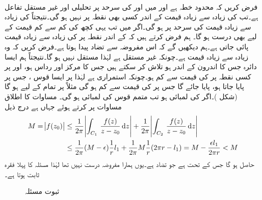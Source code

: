 \quad {}\\
فرض کریں کہ  محدود خطہ ہے اور  میں اور  کی سرحد  پر  تحلیلی اور غیر مستقل  تفاعل ہے۔تب   کی زیادہ سے زیادہ قیمت  کے اندر کسی بھی نقطہ پر نہیں ہو گی۔نتیجتاً  کی زیادہ سے زیادہ قیمت  کی سرحد پر ہو گی۔اگر  میں  تب یہی کچھ  کی کم سے کم قیمت کے لیے بھی درست ہو گا۔
\quad
ہم فرض کرتے ہیں کہ  کے اندر نقطہ  پر  کی زیادہ سے زیادہ قیمت پائی جاتی ہے۔ہم دیکھیں گے کہ اس مفروضہ سے تضاد پیدا ہوتا ہے۔فرض کریں کہ وہ زیادہ سے زیادہ قیمت  ہے۔چونکہ  غیر مستقل ہے لہٰذا  مستقل نہیں ہو گا۔نتیجتاً ہم  ایسا دائرہ  جس کا اندرون  کے اندر  ہو تلاش کر سکتے ہیں جس کا مرکز  اور رداس  ہو، اور  پر کسی نقطہ  پر  کی قیمت  سے کم ہو۔چونکہ  استمراری ہے لہٰذا   پر ایسا قوس ، جس پر  پایا جاتا ہو، پایا جائے گا جس پر  کی قیمت  سے کم ہو گی مثلاً  پر تمام  کے لیے  ہو گا (شکل )۔اگر  کی لمبائی  ہو تب متمم قوس  کی لمبائی  ہو گی۔ مساوات  کا اطلاق مساوات  پر کرتے ہوئے جہاں  ہے درج ذیل
\begin{align*}
M=\abs{f(z_0)}&\le \frac{1}{2\pi} \abs{\int_{C_1}\, \frac{f(z)}{z-z_0}\dif z}+\frac{1}{2\pi}\abs{\int_{C_2}\,\frac{f(z)}{z-z_0}\dif z}\\
&\le \frac{1}{2\pi}(M-\epsilon)\frac{1}{r}l_1+\frac{1}{2\pi} M\frac{1}{r}(2\pi r-l_1)=M-\frac{\epsilon l_1}{2\pi r}<M
\end{align*}
حاصل ہو گا  جس کے تحت  ہے جو تضاد ہے۔یوں ہمارا مفروضہ درست نہیں تھا لہٰذا مسئلہ کا پہلا فقرہ ثابت ہوتا ہے۔
\begin{figure}
\centering
{}
\caption{ثبوت مسئلہ }
\label{شکل_مسئلہ_مخفی_قوہ_بلند_تر_سرحد_پر}
\end{figure} 

